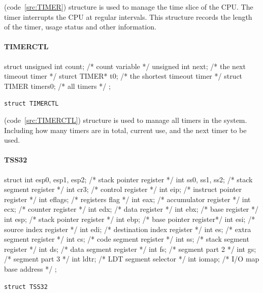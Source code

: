 \documentclass{swfcthesis}
\begin{document}
(code~\ref{src:TIMER}) structure is used to manage the time slice of the CPU. The timer
interrupts the CPU at regular intervals. This structure records the length of the timer,
usage status and other information.



\paragraph{TIMERCTL}

\begin{listing}[H]
  \begin{codeblock}
\begin{ccode}
struct 
{ 
  unsigned int count;   /* count variable */
  unsigned int next;    /* the next timeout timer */
  sturct TIMER* t0;     /* the shortest timeout timer */
  struct TIMER timers0; /* all timers */
};
\end{ccode}
  \end{codeblock}
  \caption{\texttt{struct TIMERCTL}}\label{src:TIMERCTL}
\end{listing}

(code~\ref{src:TIMERCTL}) structure is used to manage all timers in the system. Including
how many timers are in total, current use, and the next timer to be used.



\paragraph{TSS32}

\begin{listing}[H]
  \begin{codeblock}
\begin{ccode}
struct 
{ 
  int esp0, esp1, esp2; /* stack pointer register */
  int ss0, ss1, ss2;    /* stack segment register */
  int cr3;              /* control register */
  int eip;              /* instruct pointer register */
  int eflags;           /* registers flag */
  int eax;              /* accumulator register */
  int ecx;              /* counter register */
  int edx;              /* data register */
  int ebx;              /* base register */
  int esp;              /* stack pointer register */
  int ebp;              /* base pointer register*/
  int esi;              /* source index register */
  int edi;              /* destination index register */
  int es;               /* extra segment register */
  int cs;               /* code segment register */
  int ss;               /* stack segment register */
  int ds;               /* data segment register */
  int fs;               /* segment part 2 */
  int gs;               /* segment part 3 */
  int ldtr;             /* LDT segment selector */
  int iomap;            /* I/O map base address */
};
\end{ccode}
  \end{codeblock}
  \caption{\texttt{struct TSS32}}\label{src:TSS32}
\end{listing}
\end{document}

